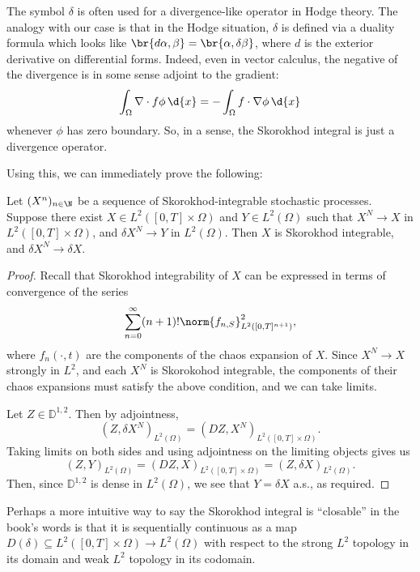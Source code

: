 \documentclass[
    a4paper,
    DIV=14,
    abstract=true,
    numbers=noenddot
]{scrartcl}
\begin{document}
\begin{remark}
	The symbol $\delta$ is often used for a divergence-like operator in Hodge
	theory. The analogy with our case is that in the Hodge situation, $\delta$
	is defined via a duality formula which looks like $\br{d{\alpha},
			\beta} = \br{\alpha, \delta{\beta}}$, where $d$ is the exterior
	derivative on differential forms. Indeed, even in vector calculus, the
	negative of the divergence is in some sense adjoint to the gradient:
	\[
		\int_\Omega \nabla\cdot{f} \phi \, \d{x}
		= - \int_\Omega f \cdot \nabla{\phi} \, \d{x}
	\]
	whenever $\phi$ has zero boundary. So, in a sense, the Skorokhod integral is
	just a divergence operator.
\end{remark}

Using this, we can immediately prove the following:

\begin{corollary}
	Let $(X^n)_{n \in \N}$ be a sequence of Skorokhod-integrable stochastic
	processes. Suppose there exist $X \in L^2([0,T]\times\Omega)$ and $Y
		\in L^2(\Omega)$ such that $X^N \to X$ in $L^2([0,T]\times\Omega)$, and
	$\delta{X^N} \to Y$ in $L^2(\Omega)$. Then $X$ is Skorokhod integrable, and
	$\delta{X^N} \to \delta{X}$.
\end{corollary}
\begin{proof}
	Recall that Skorokhod integrability of $X$ can be expressed in terms of
	convergence of the series
	\[
		\sum_{n = 0}^\infty
		(n + 1)! \norm{{f}_{n,S}}_{L^2([0, T]^{n + 1})}^2,
	\]
	where $f_n(\cdot, t)$ are the components of the chaos expansion of $X$.
	Since $X^N \to X$ strongly in $L^2$, and each $X^N$ is Skorokohod
	integrable, the components of their chaos expansions must satisfy the above
	condition, and we can take limits.

	Let $Z \in \mathbb{D}^{1, 2}$. Then by adjointness,
	\[
		(Z, \delta{X^N})_{L^2(\Omega)}
		= (DZ, X^N)_{L^2([0,T]\times\Omega)}.
	\]
	Taking limits on both sides and using adjointness on the limiting
	objects gives us
	\[
		(Z, Y)_{L^2(\Omega)}
		= (DZ, X)_{L^2([0,T]\times\Omega)}
		= (Z, \delta{X})_{L^2(\Omega)}.
	\]
	Then, since $\mathbb{D}^{1, 2}$ is dense in $L^2(\Omega)$, we see that $Y =
		\delta{X}$ a.s., as required.
\end{proof}

\begin{remark}
	Perhaps a more intuitive way to say the Skorokhod integral is ``closable''
	in the book's words is that it is sequentially continuous as a map
	$D(\delta) \subseteq L^2([0,T]\times\Omega) \to L^2(\Omega)$ with
	respect to the strong $L^2$ topology in its domain and weak $L^2$ topology
	in its codomain.
\end{remark}
\end{document}
